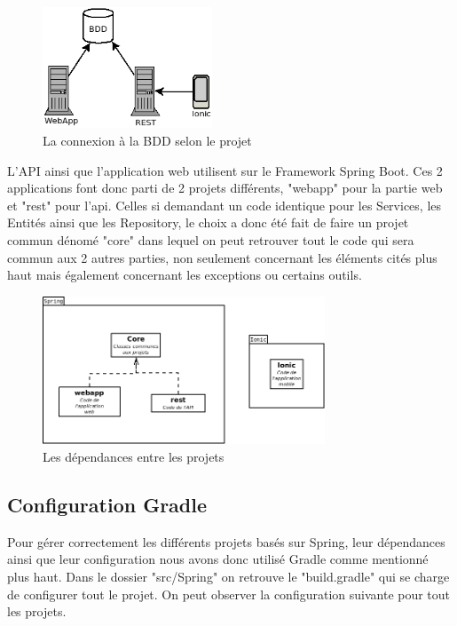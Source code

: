 			\begin{figure}[H]
				\centering\includegraphics[width=0.45\textwidth, keepaspectratio]{res/diag_infra.png}
				\caption{La connexion à la BDD selon le projet}
			\end{figure}

			L'API ainsi que l'application web utilisent sur le Framework Spring Boot. Ces 2 applications font donc parti de 2 projets différents, "webapp" pour la partie web et "rest" pour l'api. Celles si demandant un code identique pour les Services, les Entités ainsi que les Repository, le choix a donc été fait de faire un projet commun dénomé "core" dans lequel on peut retrouver tout le code qui sera commun aux 2 autres parties, non seulement concernant les éléments cités plus haut mais également concernant les exceptions ou certains outils.

			\begin{figure}[H]
				\centering\includegraphics[width=0.75\textwidth, keepaspectratio]{res/diag_projet.png}
				\caption{Les dépendances entre les projets}
			\end{figure}

		\subsection{Configuration Gradle}

			Pour gérer correctement les différents projets basés sur Spring, leur dépendances ainsi que leur configuration nous avons donc utilisé Gradle comme mentionné plus haut. Dans le dossier "src/Spring" on retrouve le "build.gradle" qui se charge de configurer tout le projet. On peut observer la configuration suivante pour tout les projets.

